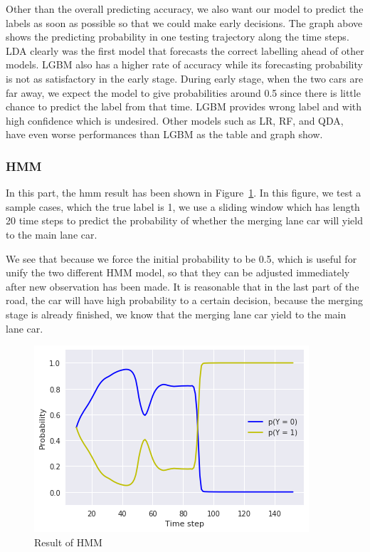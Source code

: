 \documentclass[conference]{IEEEtran}
\begin{document}
Other than the overall predicting accuracy, we also want our model to predict the labels as soon as possible so that we could make early decisions. The graph above shows the predicting probability in one testing trajectory along the time steps. LDA clearly was the first model that forecasts the correct labelling ahead of other models. LGBM also has a higher rate of accuracy while its forecasting probability is not as satisfactory in the early stage. During early stage, when the two cars are far away, we expect the model to give probabilities around 0.5 since there is little chance to predict the label from that time. LGBM provides wrong label and with high confidence which is undesired. Other models such as LR, RF, and QDA, have even worse performances than LGBM as the table and graph show. 

\subsubsection{HMM}

In this part, the hmm result has been shown in Figure~\ref{fig:hmmResult}. In this figure, we test a sample cases, which the true label is 1, we use a sliding window which has length 20 time steps to predict the probability of whether the merging lane car will yield to the main lane car.

We see that because we force the initial probability to be 0.5, which is useful for unify the two different HMM model, so that they can be adjusted immediately after new observation has been made. It is reasonable that in the last part of the road, the car will have high probability to a certain decision, because the merging stage is already finished, we know that the merging lane car yield to the main lane car.

\begin{figure}[H]
	\centering
	\includegraphics[scale = 0.6]{hmm_res.png}
	\caption{Result of HMM}
	\label{fig:hmmResult}
\end{figure}
\end{document}
